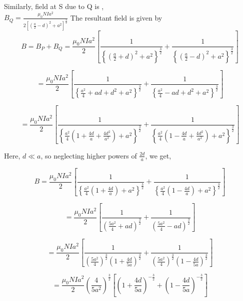 \documentclass{beamer}
\begin{document}
\begin{frame}
Similarly, field at S  due to Q is ,\\
\hspace{2cm} $B_Q=\frac{\mu_0NIa^2}{2[(\frac{a}{2}-d)^2+a^2]^{\frac{3}{2}}}$ 
The resultant field is given by\\
\[
B = B_P + B_Q = \frac{\mu_0 N I a^2}{2} \left[ \frac{1}{\left\{ \left( \frac{a}{2} + d \right)^2 + a^2 \right\}^{\frac{3}{2}}} + \frac{1}{\left\{ \left( \frac{a}{2} - d \right)^2 + a^2 \right\}^{\frac{3}{2}}} \right]
\]

\[
= \frac{\mu_0 N I a^2}{2} \left[ \frac{1}{\left\{ \frac{a^2}{4} + ad + d^2 + a^2 \right\}^{\frac{3}{2}}} + \frac{1}{\left\{ \frac{a^2}{4} - ad + d^2 + a^2 \right\}^{\frac{3}{2}}} \right]
\]

\[
= \frac{\mu_0 N I a^2}{2} \left[ \frac{1}{\left\{ \frac{a^2}{4} \left(1 + \frac{4d}{a} + \frac{4d^2}{a^2}\right) + a^2 \right\}^{\frac{3}{2}}} + \frac{1}{\left\{ \frac{a^2}{4} \left(1 - \frac{4d}{a} + \frac{4d^2}{a^2}\right) + a^2 \right\}^{\frac{3}{2}}} \right]
\]


\end{frame}


\begin{frame}


Here, \( d \ll a \), so neglecting higher powers of \( \frac{2d}{a} \), we get,

\[
B = \frac{\mu_0 N I a^2}{2} \left[ \frac{1}{\left\{ \frac{a^2}{4} \left(1 + \frac{4d}{a} \right) + a^2 \right\}^{\frac{3}{2}}} + \frac{1}{\left\{ \frac{a^2}{4} \left(1 - \frac{4d}{a} \right) + a^2 \right\}^{\frac{3}{2}}} \right]
\]

\[
= \frac{\mu_0 N I a^2}{2} \left[ \frac{1}{\left( \frac{5a^2}{4} + ad \right)^{\frac{3}{2}}} + \frac{1}{\left( \frac{5a^2}{4} - ad \right)^{\frac{3}{2}}} \right]
\]

\[
= \frac{\mu_0 N I a^2}{2} \left[ \frac{1}{\left( \frac{5a^2}{4} \right)^{\frac{3}{2}} \left(1 + \frac{4d}{5a}\right)^{\frac{3}{2}}} + \frac{1}{\left( \frac{5a^2}{4} \right)^{\frac{3}{2}} \left(1 - \frac{4d}{5a}\right)^{\frac{3}{2}}} \right]
\]



\[
= \frac{\mu_0 N I a^2}{2} \left( \frac{4}{5a^2} \right)^{\frac{3}{2}} \left[ \left(1 + \frac{4d}{5a} \right)^{-\frac{3}{2}} + \left(1 - \frac{4d}{5a} \right)^{-\frac{3}{2}} \right]
\]

\end{frame}
\end{document}

